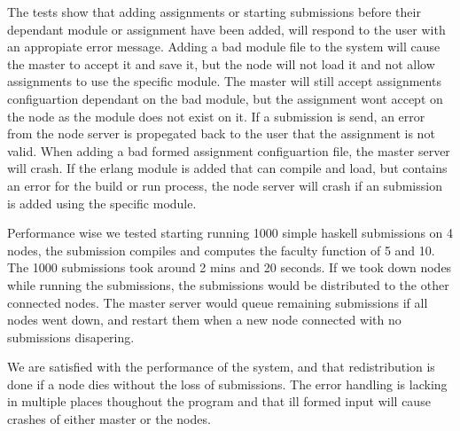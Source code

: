 The tests show that adding assignments or starting submissions before their dependant module or assignment have been added, will respond to the user with an appropiate error message. Adding a bad module file to the system will cause the master to accept it and save it, but the node will not load it and not allow assignments to use the specific module. The master will still accept assignments configuartion dependant on the bad module, but the assignment wont accept on the node as the module does not exist on it. If a submission is send, an error from the node server is propegated back to the user that the assignment is not valid. When adding a bad formed assignment configuartion file, the master server will crash. If the erlang module is added that can compile and load, but contains an error for the build or run process, the node server will crash if an submission is added using the specific module.

Performance wise we tested starting running 1000 simple haskell submissions on 4 nodes, the submission compiles and computes the faculty function of 5 and 10. The 1000 submissions took around 2 mins and 20 seconds. If we took down nodes while running the submissions, the submissions would be distributed to the other connected nodes. The master server would queue remaining submissions if all nodes went down, and restart them when a new node connected with no submissions disapering.

We are satisfied with the performance of the system, and that redistribution is done if a node dies without the loss of submissions. The error handling is lacking in multiple places thoughout the program and that ill formed input will cause crashes of either master or the nodes.
